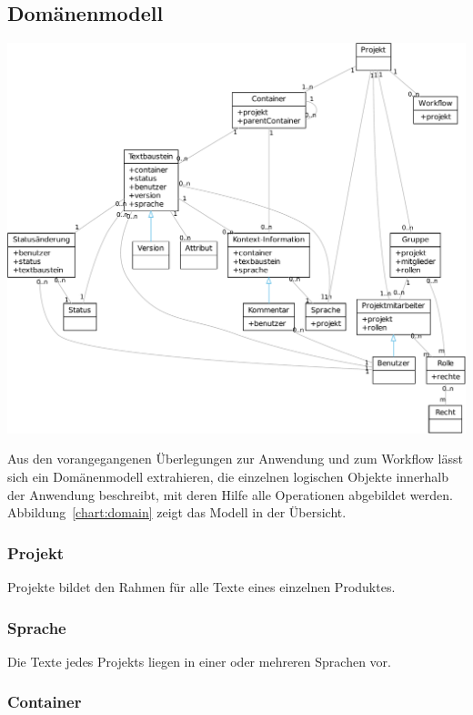 \subsection{Domänenmodell}\label{l:domänenmodell}

\begin{center}
\includegraphics[width=\textwidth]{media/domain.pdf}
\label{chart:domain}
\end{center}

Aus den vorangegangenen Überlegungen zur Anwendung und zum Workflow lässt sich ein Domänenmodell extrahieren, die einzelnen logischen Objekte innerhalb der Anwendung beschreibt, mit deren Hilfe alle Operationen abgebildet werden. Abbildung~\ref{chart:domain} zeigt das Modell in der Übersicht.

\subsubsection{Projekt}\label{model:projekt}

Projekte bildet den Rahmen für alle Texte eines einzelnen Produktes.

\subsubsection{Sprache}\label{model:sprache}

Die Texte jedes Projekts liegen in einer oder mehreren Sprachen vor.

\subsubsection{Container}\label{model:container}

